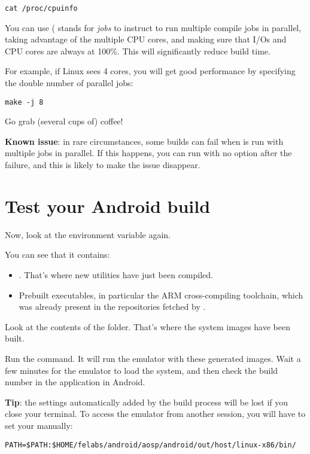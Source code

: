 \begin{verbatim}
cat /proc/cpuinfo
\end{verbatim}

You can use  ( stands for {\it jobs} to instruct 
to run multiple compile jobs in parallel, taking advantage of the multiple
CPU cores, and making sure that I/Os
and CPU cores are always at 100\%. This will significantly reduce build time.

For example, if Linux sees 4 cores, you will get good performance by specifying  
the double number of parallel jobs: 

\begin{verbatim}
make -j 8
\end{verbatim}

Go grab (several cups of) coffee!

\textbf{Known issue}: in rare circumstances, some builds can fail when 
is run with multiple jobs in parallel. If this happens, you can run 
with no option after the failure, and this is likely to make the issue disappear.

\section{Test your Android build}

Now, look at the  environment variable again.

You can see that it contains:
\begin{itemize}
   \item {}.
   That's where new utilities have just been compiled.
   \item Prebuilt executables, in particular the ARM cross-compiling toolchain,
   which was already present in the repositories fetched by .
\end{itemize}

Look at the contents of the  folder.
That's where the system images have been built.

Run the  command. It will run the emulator with these generated images.
Wait a few minutes for the emulator to load the system, and then 
check the build number in the  application in Android.

\textbf{Tip}: the  settings automatically added by the build
process will be lost if you close your terminal. To access the emulator
from another session, you will have
to set your  manually: 

\begin{verbatim}
PATH=$PATH:$HOME/felabs/android/aosp/android/out/host/linux-x86/bin/
\end{verbatim}
